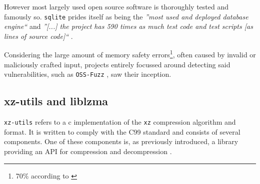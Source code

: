 However most largely used open source software is thoroughly tested and
famously so. \texttt{sqlite} prides itself as being the \textit{''most used and
deployed database engine``} \cite{sqlite2022mostdeployed} and \textit{''[...]
the project has 590 times as much test code and test scripts [as lines of
source code]``} \cite{sqlite2022testing}. 

Considering the large amount of memory safety errors\footnote{70\% according to
\cite{googleUnknownMemorySafety}}, often caused by invalid or maliciously
crafted input, projects entirely focussed around detecting said
vulnerabilities, such as \texttt{OSS-Fuzz} \cite{google2024fuzzing}, saw their
inception.

\subsection{xz-utils and liblzma}

\texttt{xz-utils} refers to a c implementation of the \texttt{xz}
compression algorithm and format. It is written to comply with the C99
standard and consists of several components. One of these components is, as
previously introduced, a library providing an API for compression and
decompression \cite{tukaani2024xz}.

\cite{ccc2024backdoor}

